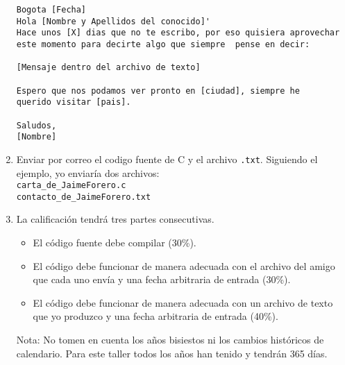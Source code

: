 \documentclass{article}
\begin{document}
\begin{enumerate}
\begin{verbatim}
Bogota [Fecha]
Hola [Nombre y Apellidos del conocido]'
Hace unos [X] dias que no te escribo, por eso quisiera aprovechar 
este momento para decirte algo que siempre  pense en decir: 

[Mensaje dentro del archivo de texto]

Espero que nos podamos ver pronto en [ciudad], siempre he 
querido visitar [pais].

Saludos,
[Nombre]
\end{verbatim}

\item
Enviar por correo el codigo fuente de C y el archivo \verb".txt". Siguiendo el ejemplo, yo enviar\'ia dos archivos:\\ \verb"carta_de_JaimeForero.c" \\ \verb"contacto_de_JaimeForero.txt"

\item
La calificaci\'on tendr\'a tres partes consecutivas. 
\begin{itemize}
\item El c\'odigo fuente debe compilar (30\%).
\item El c\'odigo debe funcionar de manera adecuada con el archivo del amigo que cada uno env\'ia y una fecha arbitraria de entrada (30\%).
\item El c\'odigo debe funcionar de manera adecuada con un archivo de texto que yo produzco y una fecha arbitraria de entrada (40\%).
\end{itemize}

Nota: No tomen en cuenta los a\~nos bisiestos ni los cambios hist\'oricos de calendario. Para este taller todos los a\~nos han tenido y tendr\'an 365 d\'ias.
\end{enumerate}
\end{document}
